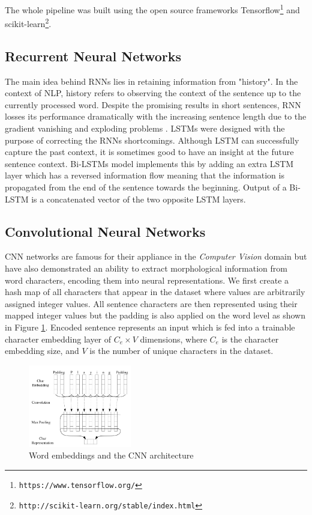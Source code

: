 \documentclass[10pt, a4paper]{article}
\begin{document}
The whole pipeline was built using the open source frameworks
Tensorflow\citep{tensorflow}\footnote{\texttt{https://www.tensorflow.org/}}
and
scikit-learn\citep{scikit}\footnote{\texttt{http://scikit-learn.org/stable/index.html}}.

\subsection{Recurrent Neural Networks}

The main idea behind RNNs lies in retaining information from "history". In the 
context of NLP, history refers to observing the context of the sentence up to the
currently processed word. Despite the promising results in short sentences, RNN
losses its performance dramatically with the increasing sentence length due to 
the gradient vanishing \cite{bengio1994learning} and exploding problems 
\cite{pascanu2013difficulty}. LSTMs were designed with the purpose of correcting 
the RNNs shortcomings. Although LSTM can successfully capture the past context,
it is sometimes good to have an insight at the future sentence context. Bi-LSTMs 
model implements this by adding an extra LSTM layer which has a reversed information flow
meaning that the information is propagated from the end of the sentence towards
the beginning. Output of a Bi-LSTM is a concatenated vector of the two opposite LSTM layers.

\subsection{Convolutional Neural Networks}
CNN networks are famous for their appliance in the \emph{Computer Vision}
domain but have also demonstrated an ability to extract morphological information
from word characters, encoding them into neural representations. We first create
a hash map of all characters that appear in the dataset where values are arbitrarily
assigned integer values. All sentence characters are then represented using their
mapped integer values but the padding is also applied on the word level as shown
in Figure \ref{fig:cnn_embed}. Encoded sentence represents an input which is fed
into a trainable character embedding layer of $C_e \times V$ dimensions, where
$C_e$ is the character embedding size, and $V$ is the number of unique characters in the dataset.

\begin{figure}
  \caption{Word embeddings and the CNN architecture}
  \label{fig:cnn_embed}
  \centering
    \includegraphics[width=0.4\textwidth]{imgs/cnn_embed.png}
\end{figure}
\end{document}
